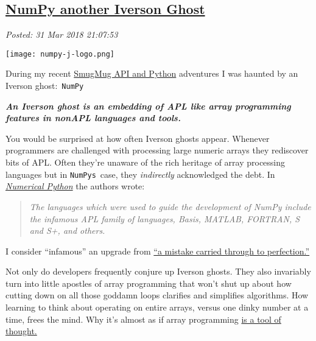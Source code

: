 %

\subsection*{\href{https://analyzethedatanotthedrivel.org/2018/03/31/numpy-another-iverson-ghost/}{NumPy another Iverson Ghost}}


\noindent\emph{Posted: 31 Mar 2018 21:07:53}
\vspace{6pt}


\captionsetup[floatingfigure]{labelformat=empty}
\begin{floatingfigure}[l]{0.23\textwidth}
\centering
\texttt{[image: numpy-j-logo.png]}
\label{fig:5565x0}
\end{floatingfigure}During
my recent \href{https://github.com/bakerjd99/smugpyter}{SmugMug API and
Python} adventures I was haunted by an Iverson ghost:~\texttt{NumPy}

\medskip

\emph{\textbf{An Iverson ghost is an embedding of APL like array
programming features in nonAPL languages and tools.}}

\medskip

You would be surprised at how often Iverson ghosts appear. Whenever
programmers are challenged with processing large numeric arrays they
rediscover bits of APL. Often they're unaware of the rich heritage of
array processing languages but in
\texttt{NumPy\textquotesingle{}s}~case, they \emph{indirectly}
acknowledged the debt. In
\href{http://numpy.sourceforge.net/numdoc/numdoc.pdf}{\emph{Numerical
Python}} the authors wrote:


\begin{quote}
\emph{The languages which were used to guide the development of NumPy
include the infamous APL family of languages, Basis, MATLAB, FORTRAN, S
and S+, and others.}
\end{quote}


I consider ``infamous'' an upgrade from
\href{http://www.cs.virginia.edu/~evans/cs655/readings/ewd498.html}{``a
mistake carried through to perfection.''}

Not only do developers frequently conjure up Iverson ghosts. They also
invariably turn into little apostles of array programming that won't
shut up about how cutting down on all those goddamn loops clarifies and
simplifies algorithms. How learning to think about operating on entire
arrays, versus one dinky number at a time, frees the mind. Why it's
almost as if array programming
\href{http://www.jsoftware.com/papers/tot.htm}{is a tool of thought.}

